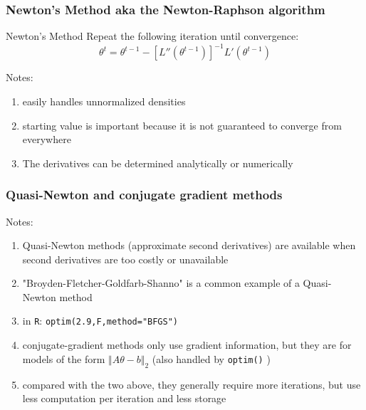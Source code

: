 \documentclass{beamer}
\begin{document}
\begin{frame}
\frametitle{Newton's Method aka the Newton-Raphson algorithm}


\begin{block}{Newton's Method}
Repeat the following iteration until convergence:
\[
\theta^{t} = \theta^{t-1} - [L''(\theta^{t-1})]^{-1} L'(\theta^{t-1} ) 
\]
\end{block}

Notes:
\begin{enumerate}
\item easily handles unnormalized densities
\item starting value is important because it is not guaranteed to converge from everywhere
\item The derivatives can be determined analytically or numerically
\end{enumerate}

\end{frame}

\begin{frame}[fragile]
\frametitle{Quasi-Newton and conjugate gradient methods}

Notes:
\begin{enumerate}
\item Quasi-Newton methods (approximate second derivatives) are available when second derivatives are too costly or unavailable
\item "Broyden-Fletcher-Goldfarb-Shanno" is a common example of a Quasi-Newton method
\item in \verb|R|: \verb|optim(2.9,F,method="BFGS")|
\item conjugate-gradient methods only use gradient information, but they are for models of the form $\Vert A \theta - b \Vert_2$ (also handled by \verb|optim()| )
\item compared with the two above, they generally require more iterations, but use less computation per iteration and less storage
\end{enumerate}

\end{frame}
\end{document}
